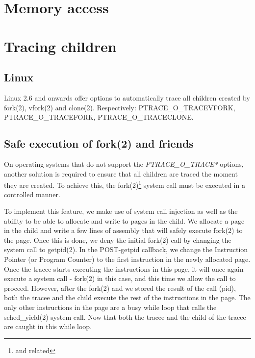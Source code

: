 \documentclass[a4paper, twoside, 10pt, twocolumn]{report}
\begin{document}
\section{Memory access}


\section{Tracing children}

\subsection{Linux}

Linux 2.6 and onwards offer options to automatically trace all children
created by fork(2), vfork(2) and clone(2). Respectively:
PTRACE\_O\_TRACEVFORK, PTRACE\_O\_TRACEFORK, PTRACE\_O\_TRACECLONE.



\subsection{Safe execution of fork(2) and friends}

On operating systems that do not support the \textit{PTRACE\_O\_TRACE*} options,
another solution is required to ensure that all children are traced the moment
they are created. To achieve this, the fork(2)\footnote{and related} system call
must be executed in a controlled manner.

To implement this feature, we make use of system call injection as well as the
ability to be able to allocate and write to pages in the child. We allocate a
page in the child and write a few lines of assembly that will safely execute
fork(2) to the page. Once this is done, we deny the initial fork(2) call by
changing the system call to getpid(2). In the POST-getpid callback, we change
the Instruction Pointer (or Program Counter) to the first instruction in the
newly allocated page. Once the tracee starts executing the instructions in this
page, it will once again execute a system call - fork(2) in this case, and this
time we allow the call to proceed. However, after the fork(2) and we stored the
result of the call (pid), both the tracee and the child execute the rest of the
instructions in the page. The only other instructions in the page are a busy
while loop that calls the sched\_yield(2) system call. Now that both the tracee
and the child of the tracee are caught in this while loop.
\end{document}
